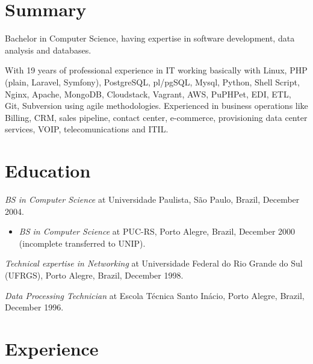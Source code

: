 \documentclass[margin]{res}
\begin{document}
  
\address{London, UK \\ andre.reis@gmail.com \\ Phone: +44 074 8210 1626}
                           
                        
\begin{resume}                        
 
\section{Summary} Bachelor in Computer Science, having expertise in software development, data analysis and databases.
                        
                  With 19 years of professional experience in IT working basically with Linux, PHP (plain, Laravel, Symfony), PostgreSQL, pl/pgSQL, Mysql, Python, Shell Script, Nginx, Apache, MongoDB, Cloudstack, Vagrant, AWS, PuPHPet, EDI, ETL, Git, Subversion using agile methodologies. Experienced in business operations like Billing, CRM, sales pipeline, contact center, e-commerce, provisioning data center services, VOIP, telecomunications and ITIL.
 
\section{Education}	
    \textit{BS in Computer Science} at Universidade Paulista, São Paulo, Brazil, December 2004.
    
    \begin{itemize}
      \item \textit{BS in Computer Science} at PUC-RS, Porto Alegre, Brazil, December 2000 (incomplete transferred to UNIP).
    \end{itemize}

    \textit{Technical expertise in Networking} at Universidade Federal do Rio Grande do Sul (UFRGS), Porto Alegre, Brazil, December 1998.
    
    \textit{Data Processing Technician} at Escola Técnica Santo Inácio, Porto Alegre, Brazil, December 1996.


\section{Experience}


\end{resume}
\end{document}

